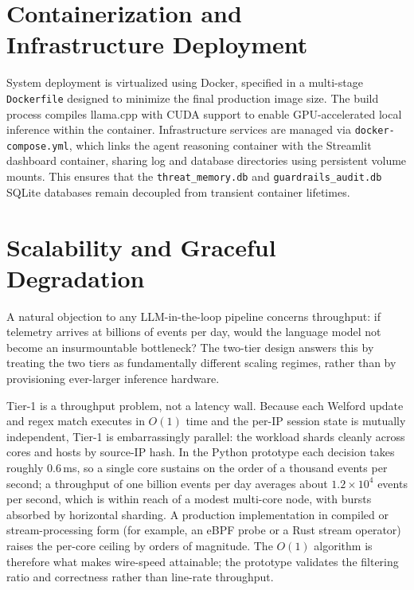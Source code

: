 \section{Containerization and Infrastructure Deployment}

System deployment is virtualized using Docker, specified in a multi-stage \texttt{Dockerfile} designed to minimize the final production image size. The build process compiles llama.cpp with CUDA support to enable GPU-accelerated local inference within the container. Infrastructure services are managed via \texttt{docker-compose.yml}, which links the agent reasoning container with the Streamlit dashboard container, sharing log and database directories using persistent volume mounts. This ensures that the \texttt{threat\_memory.db} and \texttt{guardrails\_audit.db} SQLite databases remain decoupled from transient container lifetimes.

\section{Scalability and Graceful Degradation}

A natural objection to any LLM-in-the-loop pipeline concerns throughput: if telemetry arrives at billions of events per day, would the language model not become an insurmountable bottleneck? The two-tier design answers this by treating the two tiers as fundamentally different scaling regimes, rather than by provisioning ever-larger inference hardware.

Tier-1 is a throughput problem, not a latency wall. Because each Welford update and regex match executes in $O(1)$ time and the per-IP session state is mutually independent, Tier-1 is embarrassingly parallel: the workload shards cleanly across cores and hosts by source-IP hash. In the Python prototype each decision takes roughly $0.6$\,ms, so a single core sustains on the order of a thousand events per second; a throughput of one billion events per day averages about $1.2\times10^{4}$ events per second, which is within reach of a modest multi-core node, with bursts absorbed by horizontal sharding. A production implementation in compiled or stream-processing form (for example, an eBPF probe or a Rust stream operator) raises the per-core ceiling by orders of magnitude. The $O(1)$ algorithm is therefore what makes wire-speed attainable; the prototype validates the filtering ratio and correctness rather than line-rate throughput.

